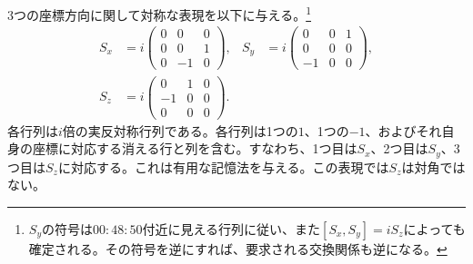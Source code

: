 3つの座標方向に関して対称な表現を以下に与える。\footnote{\(S_y\)の符号は\(00{:}48{:}50\)付近に見える行列に従い、また\([S_x,S_y]=iS_z\)によっても確定される。その符号を逆にすれば、要求される交換関係も逆になる。}
\begin{equation}
\begin{aligned}
S_x
&=
i
\begin{pmatrix}
0&0&0\\
0&0&1\\
0&-1&0
\end{pmatrix},
&
S_y
&=
i
\begin{pmatrix}
0&0&1\\
0&0&0\\
-1&0&0
\end{pmatrix},\\
S_z
&=
i
\begin{pmatrix}
0&1&0\\
-1&0&0\\
0&0&0
\end{pmatrix}.
\end{aligned}
\end{equation}
各行列は\(i\)倍の実反対称行列である。各行列は1つの\(1\)、1つの\(-1\)、およびそれ自身の座標に対応する消える行と列を含む。すなわち、1つ目は\(S_x\)、2つ目は\(S_y\)、3つ目は\(S_z\)に対応する。これは有用な記憶法を与える。この表現では\(S_z\)は対角ではない。

